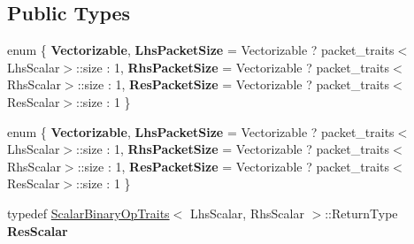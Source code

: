 \subsection*{Public Types}
\begin{DoxyCompactItemize}
\item 
\mbox{\label{struct_eigen_1_1internal_1_1general__matrix__vector__product_3_01_index_00_01_lhs_scalar_00_01_l24320a1e63993864008333cadda60258_a27211937586715ea7648276ee0369a52}} 
enum \{ {\bfseries Vectorizable}, 
{\bfseries Lhs\+Packet\+Size} = Vectorizable ? packet\+\_\+traits$<$Lhs\+Scalar$>$\+:\+:size \+: 1, 
{\bfseries Rhs\+Packet\+Size} = Vectorizable ? packet\+\_\+traits$<$Rhs\+Scalar$>$\+:\+:size \+: 1, 
{\bfseries Res\+Packet\+Size} = Vectorizable ? packet\+\_\+traits$<$Res\+Scalar$>$\+:\+:size \+: 1
 \}
\item 
\mbox{\label{struct_eigen_1_1internal_1_1general__matrix__vector__product_3_01_index_00_01_lhs_scalar_00_01_l24320a1e63993864008333cadda60258_a55a67879f90c794325b8cbac7c803a13}} 
enum \{ {\bfseries Vectorizable}, 
{\bfseries Lhs\+Packet\+Size} = Vectorizable ? packet\+\_\+traits$<$Lhs\+Scalar$>$\+:\+:size \+: 1, 
{\bfseries Rhs\+Packet\+Size} = Vectorizable ? packet\+\_\+traits$<$Rhs\+Scalar$>$\+:\+:size \+: 1, 
{\bfseries Res\+Packet\+Size} = Vectorizable ? packet\+\_\+traits$<$Res\+Scalar$>$\+:\+:size \+: 1
 \}
\item 
\mbox{\label{struct_eigen_1_1internal_1_1general__matrix__vector__product_3_01_index_00_01_lhs_scalar_00_01_l24320a1e63993864008333cadda60258_a4b5437643d10b8c62c3d563f64f5cc33}} 
typedef \hyperlink{group___core___module_struct_eigen_1_1_scalar_binary_op_traits}{Scalar\+Binary\+Op\+Traits}$<$ Lhs\+Scalar, Rhs\+Scalar $>$\+::Return\+Type {\bfseries Res\+Scalar}
\item 
\mbox{\label{struct_eigen_1_1internal_1_1general__matrix__vector__product_3_01_index_00_01_lhs_scalar_00_01_l24320a1e63993864008333cadda60258_a3793a43c5edfb50f5ff0e6a97038ea65}} 

\end{DoxyCompactItemize}
